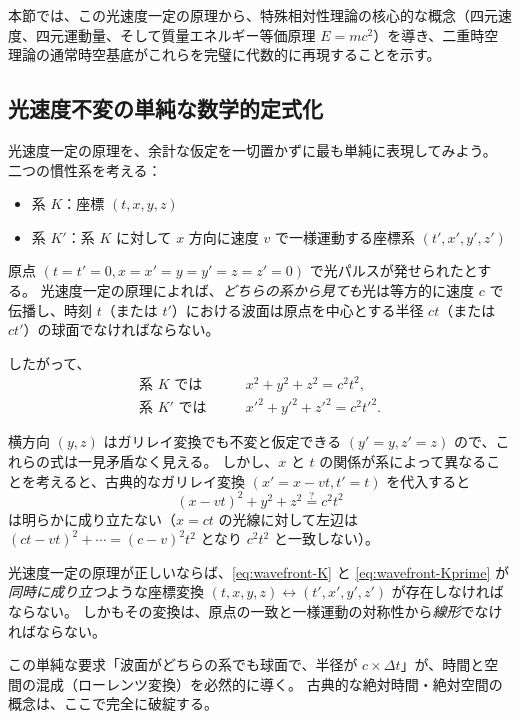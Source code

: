 \documentclass[dvipdfmx,a4paper]{jsbook}
\theoremstyle{definition}
\theoremstyle{remark}
\begin{document}
本節では、この光速度一定の原理から、特殊相対性理論の核心的な概念（四元速度、四元運動量、そして質量エネルギー等価原理 $E=mc^2$）を導き、二重時空理論の通常時空基底がこれらを完璧に代数的に再現することを示す。

\subsection{光速度不変の単純な数学的定式化}
\label{subsec:light-speed-invariance-simple}

光速度一定の原理を、余計な仮定を一切置かずに最も単純に表現してみよう。  
二つの慣性系を考える：
\begin{itemize}
  \item 系 $K$：座標 $(t, x, y, z)$
  \item 系 $K'$：系 $K$ に対して $x$ 方向に速度 $v$ で一様運動する座標系 $(t', x', y', z')$
\end{itemize}

原点 $(t=t'=0, x=x'=y=y'=z=z'=0)$ で光パルスが発せられたとする。  
光速度一定の原理によれば、\emph{どちらの系から見ても}光は等方的に速度 $c$ で伝播し、時刻 $t$（または $t'$）における波面は原点を中心とする半径 $c t$（または $c t'$）の球面でなければならない。

したがって、
\begin{align}
  \text{系 $K$ では} \qquad & x^2 + y^2 + z^2 = c^2 t^2, 
  \label{eq:wavefront-K} \\
  \text{系 $K'$ では} \qquad & x'^2 + y'^2 + z'^2 = c^2 t'^2.
  \label{eq:wavefront-Kprime}
\end{align}

横方向 $(y, z)$ はガリレイ変換でも不変と仮定できる $(y'=y, z'=z)$ ので、これらの式は一見矛盾なく見える。  
しかし、$x$ と $t$ の関係が系によって異なることを考えると、古典的なガリレイ変換 $(x' = x - v t, t' = t)$ を代入すると
\begin{equation}
  (x - v t)^2 + y^2 + z^2 \stackrel{?}{=} c^2 t^2
\end{equation}
は明らかに成り立たない（$x = c t$ の光線に対して左辺は $(c t - v t)^2 + \cdots = (c - v)^2 t^2$ となり $c^2 t^2$ と一致しない）。

光速度一定の原理が正しいならば、\eqref{eq:wavefront-K} と \eqref{eq:wavefront-Kprime} が\emph{同時に成り立つ}ような座標変換 $(t,x,y,z) \leftrightarrow (t',x',y',z')$ が存在しなければならない。  
しかもその変換は、原点の一致と一様運動の対称性から\emph{線形}でなければならない。

この単純な要求「波面がどちらの系でも球面で、半径が $c \times \Delta t$」が、時間と空間の混成（ローレンツ変換）を必然的に導く。  
古典的な絶対時間・絶対空間の概念は、ここで完全に破綻する。
\end{document}
